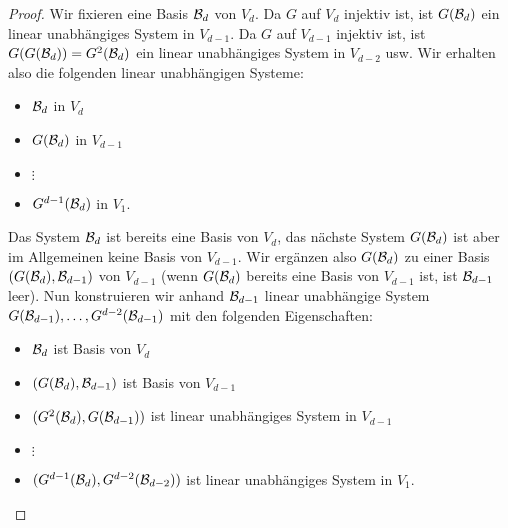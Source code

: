 \begin{proof}
	Wir fixieren eine Basis $\mathcal{B}_d$ von $V_d$. Da $G$ auf $V_d$ injektiv ist, ist $G(\mathcal{B}_d)$ ein linear unabhängiges System in $V_{d-1}$.  Da $G$ auf $V_{d-1}$ injektiv ist, ist $G(G(\mathcal{B}_d)) = G^2(\mathcal{B}_d)$ ein linear unabhängiges System in $V_{d-2}$ usw. Wir erhalten also die folgenden linear unabhängigen Systeme:
	\begin{itemize}
		\item[] $\mathcal{B}_d$ in $V_d$
		\item[] $G(\mathcal{B}_d)$ in $V_{d-1}$
		\item[] $\vdots$
		\item[] $G^{d-1}(\mathcal{B}_d)$ in $V_1$. 
	\end{itemize} 
	Das System $\mathcal{B}_d$ ist bereits eine Basis von $V_d$, das nächste System $G(\mathcal{B}_d)$ ist aber im Allgemeinen keine Basis von $V_{d-1}$. Wir ergänzen also $G(\mathcal{B}_d)$ zu einer Basis $(G(\mathcal{B}_d), \mathcal{B}_{d-1})$ von $V_{d-1}$ (wenn $G(\mathcal{B}_d)$ bereits eine Basis von $V_{d-1}$ ist, ist $\mathcal{B}_{d-1}$ leer). Nun konstruieren wir anhand $\mathcal{B}_{d-1}$ linear unabhängige System $G(\mathcal{B}_{d-1}),\ldots, G^{d-2} (\mathcal{B}_{d-1})$ mit den folgenden Eigenschaften: 
	\begin{itemize}
		\item[] $\mathcal{B}_d$ ist Basis von $V_d$
		\item[] $(G(\mathcal{B}_d),\mathcal{B}_{d-1})$ ist Basis von $V_{d-1}$
		\item[] $(G^2(\mathcal{B}_d),G(\mathcal{B}_{d-1}))$ ist linear unabhängiges System in $V_{d-1}$
		\item[] $\vdots$
		\item[] $(G^{d-1}(\mathcal{B}_d), G^{d-2}(\mathcal{B}_{d-2}))$ ist linear unabhängiges System in $V_1$. 
	\end{itemize} 
	

\end{proof}
